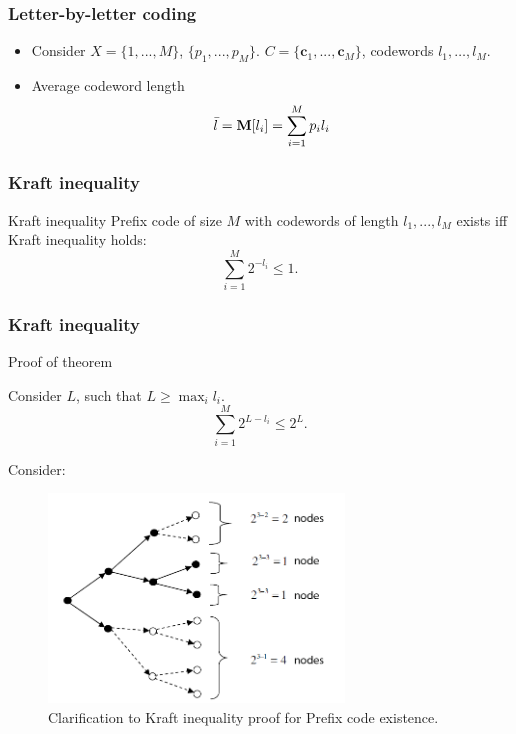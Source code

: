 \documentclass[14pt]{beamer}
\renewcommand{\vec}[1]{\ensuremath{\boldsymbol{#1}}}
\begin{document}
\begin{frame}
\frametitle{Letter-by-letter coding}
\begin{itemize}    

    \item Consider $X = \{1,...,M\}$, $\{p_1 ,...,p_M \}$.
    $C = \{\vec c_1 ,...,\vec c_M \}$, codewords $l_1,\dots,l_M$.
    
    \item  Average codeword length
    \[
    \bar {l} = {\rm {\bf M}}[l_i ] = \sum\limits_{i = 1}^M {p_i l_i } 
    \]

\end{itemize}
\end{frame}


\begin{frame}
\frametitle{Kraft inequality}

    \begin{theorem} {Kraft inequality}
    \label{Kraft_ineq}
    Prefix code of size $M$ with codewords of length $l_1 ,...,l_M $ exists iff Kraft inequality holds:
    \begin{equation}
    \label{Kraft} \sum\limits_{i = 1}^M {2^{ - l_i } \le 1} .
    \end{equation}
    \end{theorem}
\end{frame}


\begin{frame}
\frametitle{Kraft inequality}
Proof of theorem
\begin{itemize}    
\small{

    \item Consider $L$, such that $L \ge \max _i l_i $. 
    \[
    \sum\limits_{i = 1}^M {2^{L - l_i } \le 2^L} .
    \]
    
    \item Consider:
    \begin{figure}[ht]
    \begin{minipage}{1.0\linewidth}
    \includegraphics[width=0.7\textwidth]{fig2_2.png}
    \caption{Clarification to Kraft inequality proof for Prefix code existence.} \label{Kraft_nec}
    \end{minipage}
    \end{figure}
    
}
\end{itemize}
\end{frame}
\end{document}
